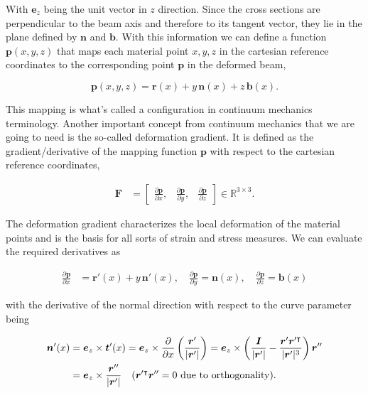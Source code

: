 With $\boldsymbol{e}_{z}$ being the unit vector in $z$ direction.
Since the cross sections are perpendicular to the beam axis and therefore to its tangent vector, they lie in the plane defined by $\boldsymbol{n}$ and $\boldsymbol{b}$.
With this information we can define a function $\boldsymbol{p}(x, y, z)$ that maps each material point $x, y, z$ in the cartesian reference coordinates to the corresponding point $\boldsymbol{p}$ in the deformed beam,

\begin{equation}
\boldsymbol{p}(x,y,z) = \boldsymbol{r}(x) + y\,\boldsymbol{n}(x) + z\,\boldsymbol{b}(x).
\end{equation}

This mapping is what's called a configuration in continuum mechanics terminology.
Another important concept from continuum mechanics that we are going to need is the so-called deformation gradient.
It is defined as the gradient/derivative of the mapping function $\boldsymbol{p}$ with respect to the cartesian reference coordinates,

\begin{align}
\boldsymbol{F} &= \begin{bmatrix}
\frac{\partial\boldsymbol{p}}{\partial x}, & \frac{\partial\boldsymbol{p}}{\partial y}, & \frac{\partial\boldsymbol{p}}{\partial z}
\end{bmatrix} \in \mathbb{R}^{3 \times 3}.
\end{align}

The deformation gradient characterizes the local deformation of the material points and is the basis for all sorts of strain and stress measures.
We can evaluate the required derivatives as

\begin{align}
\frac{\partial\boldsymbol{p}}{\partial x} &= \boldsymbol{r}'(x) + y\,\boldsymbol{n}'(x), \quad \frac{\partial\boldsymbol{p}}{\partial y} = \boldsymbol{n}(x), \quad \frac{\partial\boldsymbol{p}}{\partial z} = \boldsymbol{b}(x)
\end{align}

with the derivative of the normal direction with respect to the curve parameter being

\begin{align}
\boldsymbol{n}'(x) &= \boldsymbol{e}_{z} \times \boldsymbol{t}'(x) = \boldsymbol{e}_{z} \times \frac{\partial}{\partial x}\left(\frac{\boldsymbol{r}'}{|\boldsymbol{r}'|}\right) = \boldsymbol{e}_{z} \times \left(\frac{\boldsymbol{I}}{|\boldsymbol{r}'|} - \frac{\boldsymbol{r}'\boldsymbol{r}'^\intercal}{|\boldsymbol{r}'|^3}\right)\boldsymbol{r}'' \notag \\
&= \boldsymbol{e}_{z} \times \frac{\boldsymbol{r}''}{|\boldsymbol{r}'|} \quad\text{($\boldsymbol{r}'^\intercal\boldsymbol{r}'' = 0$ due to orthogonality)}.
\end{align}

